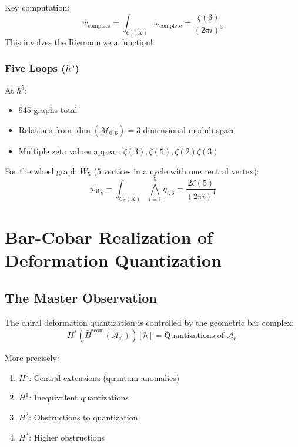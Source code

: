 Key computation:
$$w_{\text{complete}} = \int_{\overline{C}_4(X)} \omega_{\text{complete}} = \frac{\zeta(3)}{(2\pi i)^3}$$
This involves the Riemann zeta function!

\subsubsection{Five Loops ($\hbar^5$)}

At $\hbar^5$:
\begin{itemize}
\item 945 graphs total
\item Relations from $\dim(\mathcal{M}_{0,6}) = 3$ dimensional moduli space
\item Multiple zeta values appear: $\zeta(3), \zeta(5), \zeta(2)\zeta(3)$
\end{itemize}

\begin{example}
For the wheel graph $W_5$ (5 vertices in a cycle with one central vertex):
$$w_{W_5} = \int_{\overline{C}_5(X)} \bigwedge_{i=1}^5 \eta_{i,6} = \frac{2\zeta(5)}{(2\pi i)^4}$$
\end{example}

\section{Bar-Cobar Realization of Deformation Quantization}

\subsection{The Master Observation}

\begin{theorem}
The chiral deformation quantization is controlled by the geometric bar complex:
$$H^*(\bar{B}^{\text{geom}}(\mathcal{A}_{\text{cl}}))[\hbar] = \text{Quantizations of } \mathcal{A}_{\text{cl}}$$

More precisely:
\begin{enumerate}
\item $H^0$: Central extensions (quantum anomalies)
\item $H^1$: Inequivalent quantizations
\item $H^2$: Obstructions to quantization
\item $H^3$: Higher obstructions
\end{enumerate}
\end{theorem}

